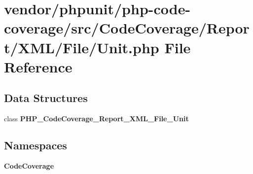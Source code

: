 \section{vendor/phpunit/php-\/code-\/coverage/src/\+Code\+Coverage/\+Report/\+X\+M\+L/\+File/\+Unit.php File Reference}
\label{_unit_8php}
\subsection*{Data Structures}
\begin{DoxyCompactItemize}
\item 
class {\bf P\+H\+P\+\_\+\+Code\+Coverage\+\_\+\+Report\+\_\+\+X\+M\+L\+\_\+\+File\+\_\+\+Unit}
\end{DoxyCompactItemize}
\subsection*{Namespaces}
\begin{DoxyCompactItemize}
\item 
 {\bf Code\+Coverage}
\end{DoxyCompactItemize}
